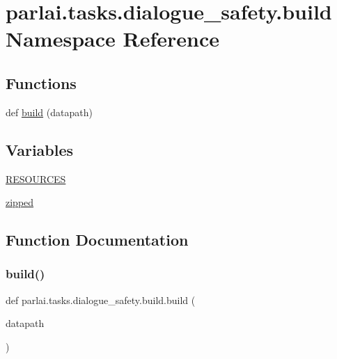 \hypertarget{namespaceparlai_1_1tasks_1_1dialogue__safety_1_1build}{}\section{parlai.\+tasks.\+dialogue\+\_\+safety.\+build Namespace Reference}
\label{namespaceparlai_1_1tasks_1_1dialogue__safety_1_1build}
\subsection*{Functions}
\begin{DoxyCompactItemize}
\item 
def \hyperlink{namespaceparlai_1_1tasks_1_1dialogue__safety_1_1build_a455bdcaa83ad5436bff9da4dcf869412}{build} (datapath)
\end{DoxyCompactItemize}
\subsection*{Variables}
\begin{DoxyCompactItemize}
\item 
\hyperlink{namespaceparlai_1_1tasks_1_1dialogue__safety_1_1build_aad22d072dd08c53383284b9a7270fed5}{R\+E\+S\+O\+U\+R\+C\+ES}
\item 
\hyperlink{namespaceparlai_1_1tasks_1_1dialogue__safety_1_1build_a64add3ae57430e2e21bb466a9b732820}{zipped}
\end{DoxyCompactItemize}


\subsection{Function Documentation}
\mbox{\label{namespaceparlai_1_1tasks_1_1dialogue__safety_1_1build_a455bdcaa83ad5436bff9da4dcf869412}} 
\subsubsection{\texorpdfstring{build()}{build()}}
{\footnotesize\ttfamily def parlai.\+tasks.\+dialogue\+\_\+safety.\+build.\+build (\begin{DoxyParamCaption}\item[{}]{datapath }\end{DoxyParamCaption})}



